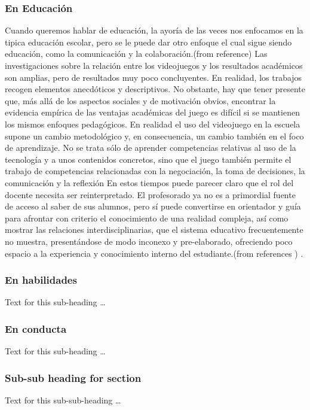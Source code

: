 \documentclass{bmcart}
\begin{document}
\subsubsection*{En Educación}
Cuando queremos hablar de educación, la ayoría de las veces nos enfocamos en la tipica educación escolar, pero se le puede dar otro enfoque el cual sigue siendo educación, como la comunicación y la colaboración.(from reference\cite{sanchez2008videojuegos})
\newline
Las investigaciones sobre la relación entre los videojuegos y los resultados académicos son amplias, pero de resultados muy poco concluyentes. En realidad, los trabajos recogen elementos anecdóticos y descriptivos. No obstante, hay que tener presente que, más allá de los aspectos sociales y de motivación obvios, encontrar la evidencia empírica de las ventajas académicas del juego es difícil si se mantienen los mismos enfoques pedagógicos. En realidad el uso del videojuego en la escuela supone un cambio metodológico y, en consecuencia, un cambio también en el foco de aprendizaje. No se trata sólo de aprender competencias relativas al uso de la tecnología y a unos contenidos concretos, sino que el juego también permite el trabajo de competencias relacionadas con la negociación, la toma de decisiones, la comunicación y la reflexión
\newline
En estos tiempos puede parecer claro que el rol del docente necesita ser reinterpretado. El profesorado ya no es a primordial fuente de acceso al saber de sus alumnos, pero sí puede convertirse en orientador y guía para afrontar con criterio el conocimiento de una realidad compleja, así como mostrar las relaciones interdisciplinarias, que el sistema educativo frecuentemente no muestra, presentándose de modo inconexo y pre-elaborado, ofreciendo poco espacio a la experiencia y conocimiento interno del estudiante.(from references\cite{ruiz2012aprendiendo} \cite{pascual2010aprendiendo})
\newline
.
\subsubsection*{En habilidades}
Text for this sub-heading \ldots
\subsubsection*{En conducta}
Text for this sub-heading \ldots
\subsubsection*{Sub-sub heading for section}
Text for this sub-sub-heading \ldots
\end{document}
